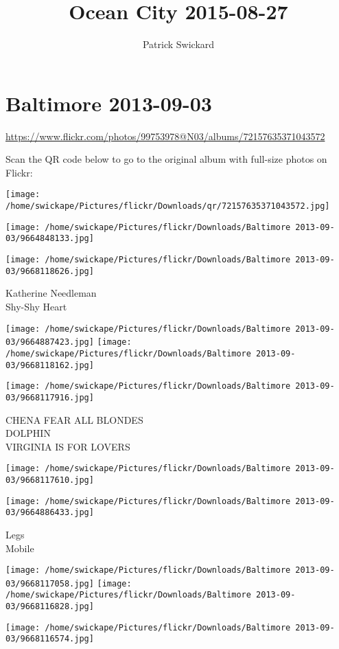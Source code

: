\documentclass[10pt,letterpaper]{article}
\title{Ocean City 2015-08-27}
\author{Patrick Swickard}
\date{}
\begin{document}
\section*{Baltimore 2013-09-03}

\url{https://www.flickr.com/photos/99753978@N03/albums/72157635371043572}

Scan the QR code below to go to the original album with full-size photos on Flickr:

\texttt{[image: /home/swickape/Pictures/flickr/Downloads/qr/72157635371043572.jpg]}
\pagebreak

\texttt{[image: /home/swickape/Pictures/flickr/Downloads/Baltimore 2013-09-03/9664848133.jpg]}

\vspace{0.25in}
\texttt{[image: /home/swickape/Pictures/flickr/Downloads/Baltimore 2013-09-03/9668118626.jpg]}

Katherine Needleman\\
Shy{-}Shy Heart
\pagebreak

\texttt{[image: /home/swickape/Pictures/flickr/Downloads/Baltimore 2013-09-03/9664887423.jpg]}
\texttt{[image: /home/swickape/Pictures/flickr/Downloads/Baltimore 2013-09-03/9668118162.jpg]}

\vspace{0.25in}
\texttt{[image: /home/swickape/Pictures/flickr/Downloads/Baltimore 2013-09-03/9668117916.jpg]}

CHENA FEAR ALL BLONDES\\
DOLPHIN\\
VIRGINIA IS FOR LOVERS
\pagebreak

\texttt{[image: /home/swickape/Pictures/flickr/Downloads/Baltimore 2013-09-03/9668117610.jpg]}

\vspace{0.25in}
\texttt{[image: /home/swickape/Pictures/flickr/Downloads/Baltimore 2013-09-03/9664886433.jpg]}

Legs\\
Mobile
\pagebreak

\texttt{[image: /home/swickape/Pictures/flickr/Downloads/Baltimore 2013-09-03/9668117058.jpg]}
\texttt{[image: /home/swickape/Pictures/flickr/Downloads/Baltimore 2013-09-03/9668116828.jpg]}

\vspace{0.25in}
\texttt{[image: /home/swickape/Pictures/flickr/Downloads/Baltimore 2013-09-03/9668116574.jpg]}
\end{document}
